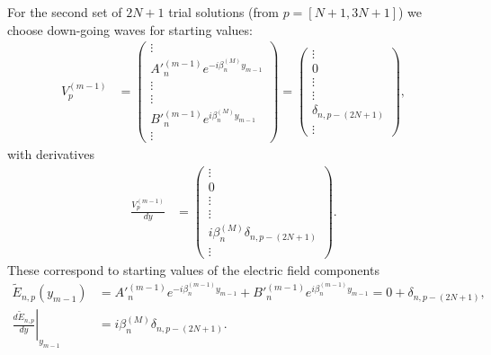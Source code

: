 For the second set of $2N+1$ trial solutions (from $p=[N+1,3N+1]$) we choose down-going waves for starting values:
\begin{align}
V^{(m-1)}_{p} &=   \left(\begin{array}{c}\vdots \\   A'^{(m-1)}_n  e^{-i \beta^{(M)}_n y_{m-1}}  \\ \vdots \\\hline \vdots \\  B'^{(m-1)}_n  e^{i \beta^{(M)}_n y_{m-1}}  \\ \vdots \end{array}\right)  =  \left(\begin{array}{c} \vdots \\   0   \\ \vdots  \\\hline \vdots \\  \delta_{n,p-(2N+1)}  \\ \vdots \end{array}\right),
\end{align}
with derivatives
\begin{align}
\frac{V^{(m-1)}_{p}}{dy} &=  \left(\begin{array}{c} \vdots \\  0   \\ \vdots \\\hline \vdots \\   i \beta^{(M)}_n \delta_{n,p-(2N+1)}   \\ \vdots \end{array}\right).
\end{align}
These correspond to starting values of the electric field components
\begin{align}
\tilde E_{n,p} (y_{m-1}) &= A'^{(m-1)}_n e^{-i \beta^{(m-1)}_n y_{m-1}} + B'^{(m-1)}_n e^{i \beta^{(m-1)}_n y_{m-1}} = 0 + \delta_{n,p-(2N+1)}, \\
\left. \frac{d \tilde E_{n,p}}{dy} \right|_{y_{m-1}} &= i \beta^{(M)}_n \delta_{n,p-(2N+1)}.
\end{align}

